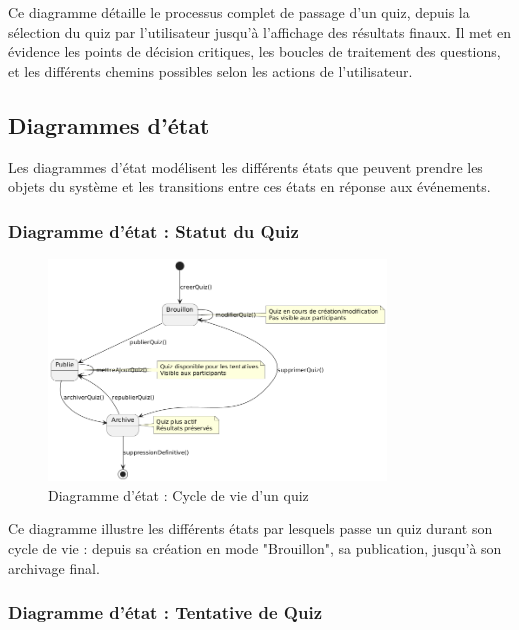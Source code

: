 \documentclass[12pt,a4paper]{report}
\begin{document}
Ce diagramme détaille le processus complet de passage d'un quiz, depuis la sélection du quiz par l'utilisateur jusqu'à l'affichage des résultats finaux. Il met en évidence les points de décision critiques, les boucles de traitement des questions, et les différents chemins possibles selon les actions de l'utilisateur.

\subsection{Diagrammes d'état}

Les diagrammes d'état modélisent les différents états que peuvent prendre les objets du système et les transitions entre ces états en réponse aux événements.

\subsubsection{Diagramme d'état : Statut du Quiz}

\begin{figure}[htbp]
    \centering
    \includegraphics[width=0.8\textwidth]{latex_media/media/Diagrammedetat-StatutduQuiz.png}
    \caption{Diagramme d'état : Cycle de vie d'un quiz}
    \label{fig:etat-statut-quiz}
\end{figure}

Ce diagramme illustre les différents états par lesquels passe un quiz durant son cycle de vie : depuis sa création en mode "Brouillon", sa publication, jusqu'à son archivage final.

\subsubsection{Diagramme d'état : Tentative de Quiz}
\end{document}
